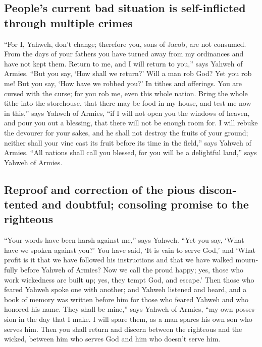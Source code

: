 \begin{paracol}{2}
\begin{otherlanguage}{english}
\hypertarget{peoples-current-bad-situation-is-self-inflicted-through-multiple-crimes}{%
\subsection{People's current bad situation is self-inflicted through
multiple
crimes}\label{peoples-current-bad-situation-is-self-inflicted-through-multiple-crimes}}

 ``For I, Yahweh, don't change; therefore you, sons of
Jacob, are not consumed.  From the days of your fathers
you have turned away from my ordinances and have not kept them. Return
to me, and I will return to you,'' says Yahweh of Armies. ``But you say,
`How shall we return?'  Will a man rob God? Yet you rob
me! But you say, `How have we robbed you?' In tithes and offerings.
 You are cursed with the curse; for you rob me, even this
whole nation.  Bring the whole tithe into the storehouse,
that there may be food in my house, and test me now in this,'' says
Yahweh of Armies, ``if I will not open you the windows of heaven, and
pour you out a blessing, that there will not be enough room for.
 I will rebuke the devourer for your sakes, and he shall
not destroy the fruits of your ground; neither shall your vine cast its
fruit before its time in the field,'' says Yahweh of Armies.
 ``All nations shall call you blessed, for you will be a
delightful land,'' says Yahweh of Armies.

\hypertarget{reproof-and-correction-of-the-pious-discontented-and-doubtful-consoling-promise-to-the-righteous}{%
\subsection{Reproof and correction of the pious discontented and
doubtful; consoling promise to the
righteous}\label{reproof-and-correction-of-the-pious-discontented-and-doubtful-consoling-promise-to-the-righteous}}

 ``Your words have been harsh against me,'' says Yahweh.
``Yet you say, `What have we spoken against you?'  You
have said, `It is vain to serve God,' and `What profit is it that we
have followed his instructions and that we have walked mournfully before
Yahweh of Armies?  Now we call the proud happy; yes,
those who work wickedness are built up; yes, they tempt God, and
escape.'  Then those who feared Yahweh spoke one with
another; and Yahweh listened and heard, and a book of memory was written
before him for those who feared Yahweh and who honored his name.
 They shall be mine,'' says Yahweh of Armies, ``my own
possession in the day that I make. I will spare them, as a man spares
his own son who serves him.  Then you shall return and
discern between the righteous and the wicked, between him who serves God
and him who doesn't serve him.


\end{otherlanguage}
\end{paracol}
